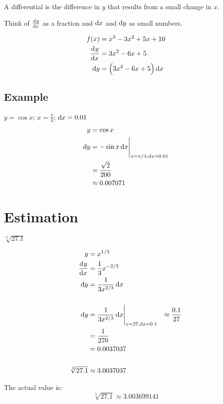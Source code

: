 \documentclass[letterpaper, landscape]{exam}
\begin{document}
  \begin{itemize*}
    \item A differential is the difference in $y$ that results from a small change in $x$.
    \item Think of $\od{y}{x}$ as a fraction and $\dif x$ and $\dif y$ as small numbers.
  \end{itemize*}

  \begin{align*}
    f(x)       & = x^3 - 3x^2 + 5x + 10 \\
    \dod{y}{x} & = 3x^2 -6x + 5 \\
    \dif y     & = \del{ 3x^2 -6x + 5 } \dif x  \\
  \end{align*}

  \subsection{Example} %
  
  $y = \cos x$; $x = \frac{\pi}{4}$; $\dif x = 0.01$
  \begin{align*}
    y      & = \cos x \\
    \dif y & = \eval{ - \sin x \dif x }_{x = \pi/4, \dif x = 0.01} \\
           & = \frac{\sqrt{2}}{200} \\
           & \approx 0.007071 \\
  \end{align*}

  \section{Estimation} %

  $\sqrt[3]{27.1}$

  \begin{solution}
    \begin{align*}
      y          & = x^{1/3} \\
      \dod{y}{x} & = \frac{1}{3} x^{-2/3} \\
      \dif y     & = \frac{1}{3 x^{2/3}} \dif x \\
      \\
      \dif y     & = \eval{ \frac{1}{3 x^{2/3}} \dif x }_{x = 27, \dif x = 0.1}
                 & \approx \frac{0.1}{27} \\
                 & = \frac{1}{270} \\
                 & = 0.0037037 \\
      \\
      \sqrt[3]{27.1} &\approx 3.0037037 \\
    \end{align*}

    The actual value is:
    \[
      \sqrt[3]{27.1} \approx 3.003699141
    \]

  \end{solution}
  
\end{document}
